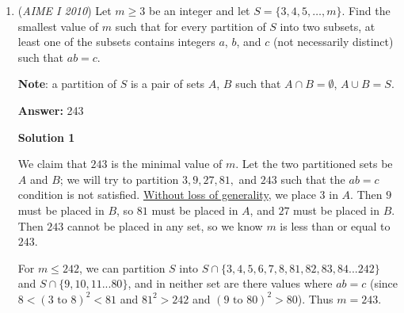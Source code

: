 \begin{enumerate}
 Let $h_1,h_2$ denote the height of the left and right cones, respectively (so $h_1 > h_2$), and let $r$ denote their common radius. The volume of a cone is given by $\frac 13 Bh$; since both cones share the same base, then the desired volume is $\frac 13 \cdot \pi r^2 \cdot (h_1 + h_2)$. The \href{https://artofproblemsolving.com/wiki/index.php?title=Distance}{distance} from the point $(8,10)$ to the line $x - 3y + 15 = 0$ is given by $\left|\frac{(8) - 3(10) + 15}{\sqrt{1^2 + (-3)^2}}\right| = \frac{7}{\sqrt{10}}$. The distance between $\left(\frac 92, \frac {13}2\right)$ and $\left(\frac{39}{4}, \frac{33}{4}\right)$ is given by $h_1 + h_2 = \sqrt{\left(\frac{18}{4} - \frac{39}{4}\right)^2 + \left(\frac{26}{4} - \frac{33}{4}\right)^2} = \frac{7\sqrt{10}}{4}$. Thus, the answer is $\frac{343\sqrt{10}\pi}{120} = \frac{343\pi}{12\sqrt{10}} \Longrightarrow 343 + 12 + 10 = \boxed{365}$.

 


	\item (\textit{AIME I 2010}) Let $m \ge 3$ be an integer and let $S = \{3,4,5,\ldots,m\}$. Find the smallest value of $m$ such that for every partition of $S$ into two subsets, at least one of the subsets contains integers $a$, $b$, and $c$ (not necessarily distinct) such that $ab = c$.


 \textbf{Note}: a partition of $S$ is a pair of sets $A$, $B$ such that $A \cap B = \emptyset$, $A \cup B = S$.


 
 \textbf{Answer: }243



\textbf{Solution 1}

We claim that $243$ is the minimal value of $m$. Let the two partitioned sets be $A$ and $B$; we will try to partition $3, 9, 27, 81,$ and $243$ such that the $ab=c$ condition is not satisfied. \href{https://artofproblemsolving.com/wiki/index.php?title=Without\_loss\_of\_generality}{Without loss of generality}, we place $3$ in $A$. Then $9$ must be placed in $B$, so $81$ must be placed in $A$, and $27$ must be placed in $B$. Then $243$ cannot be placed in any set, so we know $m$ is less than or equal to $243$.

 For $m \le 242$, we can partition $S$ into $S \cap \{3, 4, 5, 6, 7, 8, 81, 82, 83, 84 ... 242\}$ and $S \cap \{9, 10, 11 ... 80\}$, and in neither set are there values where $ab=c$ (since $8 < (3\text{ to }8)^2 < 81$ and $81^2>242$ and $(9\text{ to }80)^2 > 80$). Thus $m = \boxed{243}$.


\end{enumerate}
